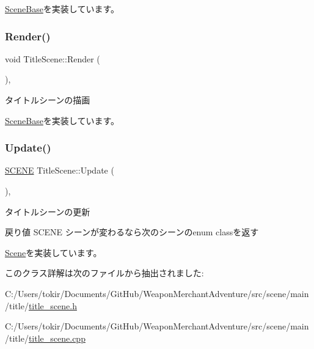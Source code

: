 \mbox{\hyperlink{class_scene_base_a24d7db43c819924dc8b07b436f6d3148}{Scene\+Base}}を実装しています。

\mbox{\label{class_title_scene_af12c59b3bf9458640938c5ca620527ae}} 
\subsubsection{\texorpdfstring{Render()}{Render()}}
{\footnotesize\ttfamily void Title\+Scene\+::\+Render (\begin{DoxyParamCaption}{ }\end{DoxyParamCaption})\hspace{0.3cm}{\ttfamily [final]}, {\ttfamily [virtual]}}



タイトルシーンの描画 



\mbox{\hyperlink{class_scene_base_ad981674ce731ea267f398e889bbb9dc3}{Scene\+Base}}を実装しています。

\mbox{\label{class_title_scene_a19f6ee49ca6c8526fb1af2c0a2df9a33}} 
\subsubsection{\texorpdfstring{Update()}{Update()}}
{\footnotesize\ttfamily \mbox{\hyperlink{scene__base_8h_a24cee5343fb9d0706ead6e8601f363be}{S\+C\+E\+NE}} Title\+Scene\+::\+Update (\begin{DoxyParamCaption}{ }\end{DoxyParamCaption})\hspace{0.3cm}{\ttfamily [final]}, {\ttfamily [virtual]}}



タイトルシーンの更新 

\begin{DoxyReturn}{戻り値}
S\+C\+E\+NE シーンが変わるなら次のシーンのenum classを返す 
\end{DoxyReturn}


\mbox{\hyperlink{class_scene_acb50f8104e5a7cfecbdececa7d5f1b39}{Scene}}を実装しています。



このクラス詳解は次のファイルから抽出されました\+:\begin{DoxyCompactItemize}
\item 
C\+:/\+Users/tokir/\+Documents/\+Git\+Hub/\+Weapon\+Merchant\+Adventure/src/scene/main/title/\mbox{\hyperlink{title__scene_8h}{title\+\_\+scene.\+h}}\item 
C\+:/\+Users/tokir/\+Documents/\+Git\+Hub/\+Weapon\+Merchant\+Adventure/src/scene/main/title/\mbox{\hyperlink{title__scene_8cpp}{title\+\_\+scene.\+cpp}}\end{DoxyCompactItemize}
